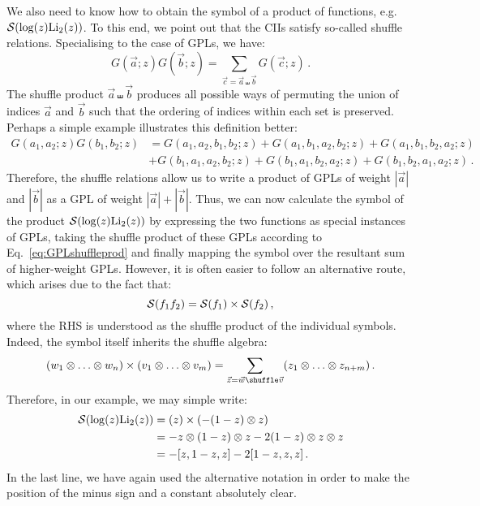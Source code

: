 \documentclass[main.tex]{subfiles}
\begin{document}
We also need to know how to obtain the symbol of a product of functions, e.g. $\mathcal{S}(\log(z) \text{Li}_2(z))$. To this end, we point out that the CIIs satisfy so-called shuffle relations. Specialising to the case of GPLs, we have:
\begin{equation} \label{eq:GPLshuffleprod}
    G(\vec{a};z)G(\vec{b};z) = \sum_{\vec{c}=\vec{a} \shuffle \vec{b}} G(\vec{c};z)\,.
\end{equation}
The shuffle product $\vec{a} \shuffle \vec{b}$ produces all possible ways of permuting the union of indices $\vec{a}$ and $\vec{b}$ such that the ordering of indices within each set is preserved. Perhaps a simple example illustrates this definition better:
\begin{align} \label{eq:shuffleexample}
    G(a_1,a_2;z) G(b_1,b_2;z) &= G(a_1,a_2,b_1,b_2;z) + G(a_1,b_1,a_2,b_2;z) + G(a_1,b_1,b_2,a_2;z) \nonumber \\ 
    & + G(b_1,a_1,a_2,b_2;z) + G(b_1,a_1,b_2,a_2;z) + G(b_1,b_2,a_1,a_2;z)\,.
\end{align}
Therefore, the shuffle relations allow us to write a product of GPLs of weight $|\vec{a}|$ and $|\vec{b}|$ as a GPL of weight $|\vec{a}|+|\vec{b}|$. Thus, we can now calculate the symbol of the product $\mathcal{S}(\log(z) \text{Li}_2(z))$ by expressing the two functions as special instances of GPLs, taking the shuffle product of these GPLs according to Eq.~\ref{eq:GPLshuffleprod} and finally mapping the symbol over the resultant sum of higher-weight GPLs. However, it is often easier to follow an alternative route, which arises due to the fact that:
\begin{equation}
    \mathcal{S}(f_1 f_2) = \mathcal{S}(f_1) \times \mathcal{S}(f_2)\,,
\end{equation}
where the RHS is understood as the shuffle product of the individual symbols. Indeed, the symbol itself inherits the shuffle algebra:
\begin{equation} \label{eq:symbolshuffle}
    (w_1 \oo \ldots \oo w_n) \times (v_1 \oo \ldots \oo v_m) = \sum_{\vec{z}=\vec{w} \shuffle \vec{v}} (z_1 \oo \ldots \oo z_{n+m})\,.
\end{equation}
Therefore, in our example, we may simple write: 
\begin{align}
    \mathcal{S}(\log(z) \text{Li}_2(z)) &= (z) \times (-(1-z)\otimes z) \nonumber \\
    &= -z \otimes (1-z) \otimes z - 2 (1-z) \otimes z \otimes z \\
    &= -[z, 1-z, z] -2[1-z, z, z] \,. \nonumber
\end{align}
In the last line, we have again used the alternative notation in order to make the position of the minus sign and a constant absolutely clear.
\end{document}
